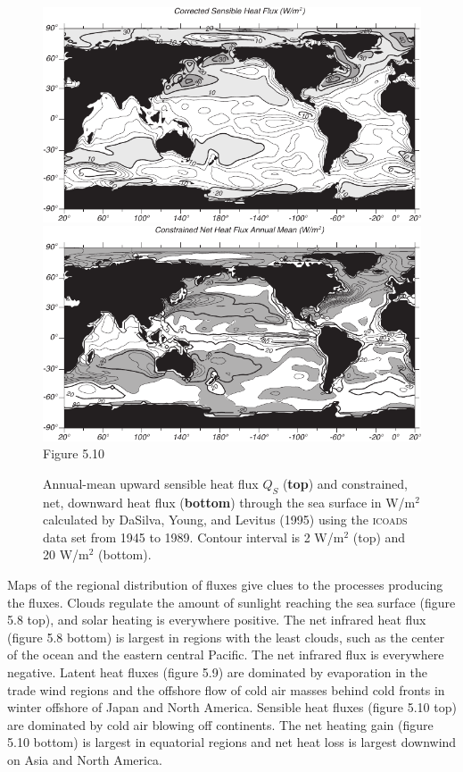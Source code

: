 \begin{figure}[t!]
\includegraphics{pics/globalsensible}
\includegraphics{pics/globalflux}
\footnotesize
Figure 5.10 \rule{0mm}{3ex}Annual-mean upward sensible heat
flux $Q_{S}$ (\textbf{top})
and constrained, net, downward heat flux (\textbf{bottom}) through the
sea surface in W/m$^2$ calculated by DaSilva, Young, and Levitus
(1995) using the \textsc{icoads} data set from 1945 to 1989. Contour
interval is 2 W/m$^2$ (top) and 20 W/m$^2$ (bottom).
\label{fig:globalsensible}
\vspace{-5ex}
\end{figure}

Maps of the regional distribution of fluxes give clues to the
processes producing the fluxes. Clouds regulate the amount of sunlight
reaching the sea surface (figure 5.8 top), and solar heating is
everywhere positive.  The net infrared heat flux
(figure 5.8 bottom) is largest in regions with the least clouds, such
as the center of the ocean and the eastern central Pacific. The net
infrared flux is everywhere negative. Latent heat fluxes (figure 5.9)
are dominated by evaporation in the trade wind regions and the
offshore flow of cold air masses behind cold fronts in winter offshore
of Japan and North America.  Sensible heat fluxes (figure 5.10 top) are dominated by cold air blowing
off continents. The net heating gain (figure 5.10 bottom) is largest
in equatorial regions and net heat loss is largest downwind on Asia
and North America.

